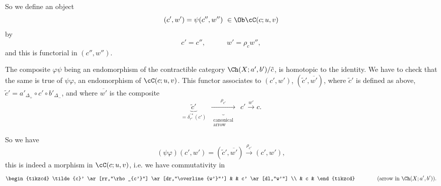 So we define an object
\[
(c',w') = \psi(c'',w'')\ \in \Ob \cC(c;u,v)
\]
by
\[
c' = c'', \qquad\quad w' = \rho_c w'',
\]
and this is functorial in $(c'',w'')$.

The composite $\varphi\psi$ being an endomorphism of the contractible category $\Ch(X;a',b')/\tilde{c}$, is homotopic to the identity. We have to check that the same is true of $\psi\varphi$, an endomorphism of $\cC(c;u,v)$. This functor associates to $(c',w')$, $(\tilde{c}',\overline{w'})$, where $\tilde{c}'$ is defined as above, $\tilde{c}' = a'_{\Delta_{+}} \circ c' \circ b'_{\Delta_{-}}$, and where $\overline{w'}$ is the composite
\[
\underbrace{\tilde{c}'}_{= \delta^{\prime *}_{\tau'}(c')}\ \ \underbrace{\xrightarrow{\ \rho_{c'}\ }}_{\substack{\text{canonical}\\ \text{arrow}}}\ \ c' \xrightarrow{w'} c.
\]

So we have
\[
(\psi\varphi)(c',w') = (\tilde{c}',\overline{w'}) \xrightarrow{\rho_{c'}} (c',w'),
\]
this is indeed a morphism in $\cC(c;u,v)$, i.e. we have commutativity in
\[
\begin{tikzcd}
\tilde{c}' \ar[rr,"\rho_{c'}"] \ar[dr,"\overline{w'}"'] & & c' \ar[dl,"w'"] \\
& c &
\end{tikzcd}
\qquad\qquad \text{(arrow in } \Ch(X;a',b')\text{).}
\]
